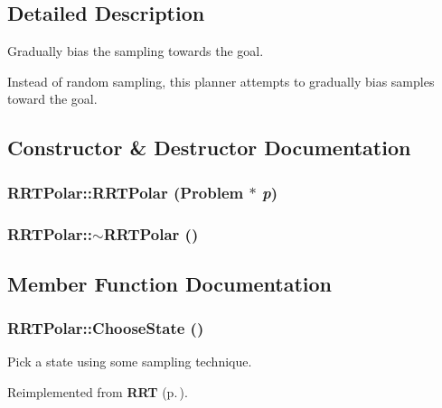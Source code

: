 \subsection{Detailed Description}
Gradually bias the sampling towards the goal.

Instead of random sampling, this planner attempts to gradually bias  samples toward the goal. 



\subsection{Constructor \& Destructor Documentation}
\subsubsection{\setlength{\rightskip}{0pt plus 5cm}RRTPolar::RRTPolar ({\bf Problem} $\ast$ {\em p})}\label{classRRTPolar_a0}


\subsubsection{\setlength{\rightskip}{0pt plus 5cm}RRTPolar::$\sim$RRTPolar ()\hspace{0.3cm}{\tt  [inline, virtual]}}\label{classRRTPolar_a1}




\subsection{Member Function Documentation}
\subsubsection{ RRTPolar::Choose\-State ()\hspace{0.3cm}{\tt  [protected, virtual]}}\label{classRRTPolar_b0}


Pick a state using some sampling technique.



Reimplemented from {\bf RRT} {\rm (p.\,\pageref{classRRT_b4})}.
